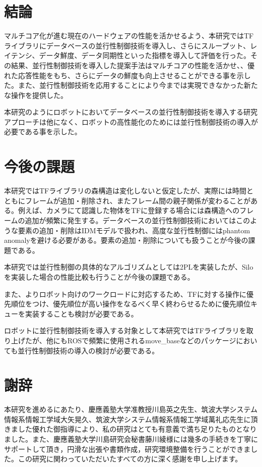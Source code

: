 \documentclass[a4paper]{jreport}	%
\begin{document}
\chapter{結論}

マルチコア化が進む現在のハードウェアの性能を活かせるよう、本研究ではTFライブラリにデータベースの並行性制御技術を導入し、さらにスループット、レイテンシ、データ鮮度、データ同期性といった指標を導入して評価を行った。その結果、並行性制御技術を導入した提案手法はマルチコアの性能を活かせ、、優れた応答性能をもち、さらにデータの鮮度も向上させることができる事を示した。また、並行性制御技術を応用することにより今までは実現できなかった新たな操作を提供した。

本研究のようにロボットにおいてデータベースの並行性制御技術を導入する研究アプローチは他になく、ロボットの高性能化のためには並行性制御技術の導入が必要である事を示した。

\chapter{今後の課題}
本研究ではTFライブラリの森構造は変化しないと仮定したが、実際には時間とともにフレームが追加・削除され、またフレーム間の親子関係が変わることがある。例えば、カメラにて認識した物体をTFに登録する場合には森構造へのフレームの追加が頻繁に発生する。データベースの並行性制御技術においてはこのような要素の追加・削除はIDMモデルで扱われ、高度な並行性制御にはphantom anomalyを避ける必要がある。要素の追加・削除についても扱うことが今後の課題である。

本研究では並行性制御の具体的なアルゴリズムとしては2PLを実装したが、Siloを実装した場合の性能比較も行うことが今後の課題である。

また、よりロボット向けのワークロードに対応するため、TFに対する操作に優先順位をつけ、優先順位が高い操作をなるべく早く終わらせるために優先順位キューを実装することも検討が必要である。

ロボットに並行性制御技術を導入する対象として本研究ではTFライブラリを取り上げたが、他にもROSで頻繁に使用されるmove\_baseなどのパッケージにおいても並行性制御技術の導入の検討が必要である。

\chapter*{謝辞}

本研究を進めるにあたり、慶應義塾大学准教授川島英之先生、筑波大学システム情報系情報工学域大矢晃久、筑波大学システム情報系情報工学域萬礼応先生に頂きました優れた御指導により、私の研究はとても有意義で満ち足りたものとなりました。また、慶應義塾大学川島研究会秘書藤川綾様には幾多の手続きを丁寧にサポートして頂き，円滑な出張や書類作成，研究環境整備を行うことができました。この研究に関わっていただいたすべての方に深く感謝を申し上げます。
\end{document}
